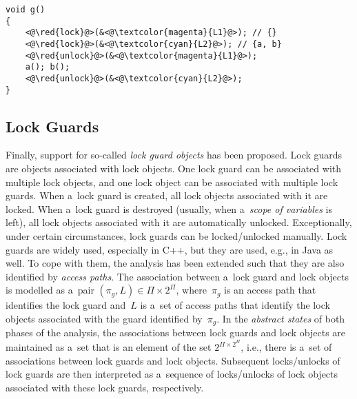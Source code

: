 \begin{lstlisting}[style=c, label={list:atomerPhase2MultiLocks}, float=hbt, caption={A~code snippet used to illustrate the \emph{advanced manipulation with locks} during the second phase of the analysis}]
void g()
{
    <@\red{lock}@>(&<@\textcolor{magenta}{L1}@>); // {}
    <@\red{lock}@>(&<@\textcolor{cyan}{L2}@>); // {a, b}
    <@\red{unlock}@>(&<@\textcolor{magenta}{L1}@>);
    a(); b();
    <@\red{unlock}@>(&<@\textcolor{cyan}{L2}@>);
}
\end{lstlisting}

\subsection{Lock Guards}

Finally, support for so-called \emph{lock guard objects} has been proposed. Lock guards are objects associated with lock objects. One lock guard can be associated with multiple lock objects, and one lock object can be associated with multiple lock guards. When a~lock guard is created, all lock objects associated with it are locked. When a~lock guard is destroyed (usually, when a~\emph{scope of variables} is left), all lock objects associated with it are automatically unlocked. Exceptionally, under certain circumstances, lock guards can be locked/unlocked manually. Lock guards are widely used, especially in C++, but they are used, e.g., in Java as well. To cope with them, the analysis has been extended such that they are also identified by \emph{access paths}. The association between a~lock guard and lock objects is modelled as a~pair $ (\pi_g, L) \in \Pi \times 2^\Pi $, where~$ \pi_g $ is an access path that identifies the lock guard and~$ L $ is a~set of access paths that identify the lock objects associated with the guard identified by~$ \pi_g $. In the \emph{abstract states} of both phases of the analysis, the associations between lock guards and lock objects are maintained as a~set that is an element of the set $ 2^{\Pi \times 2^\Pi} $, i.e., there is a~set of associations between lock guards and lock objects. Subsequent locks/unlocks of lock guards are then interpreted as a~sequence of locks/unlocks of lock objects associated with these lock guards, respectively.

